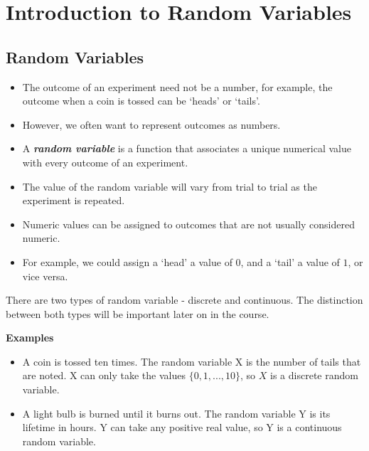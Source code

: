\documentclass[12pt]{report}
\begin{document}
{{\chapter{Introduction to Random Variables}
\section{Random Variables}
	\begin{itemize} \item The outcome of an experiment need not be a number, for example, the outcome when a coin is tossed can be `heads' or `tails'. \item
		However, we often want to represent outcomes as numbers. \item
		A \textbf{\emph{random variable}} is a function that associates a unique numerical value with every outcome of an experiment.
		\item The value of the random variable will vary from trial to trial as the experiment is repeated.
		\item Numeric values can be assigned to outcomes that are not usually considered numeric. \item For example, we could assign a `head' a value of $0$, and a `tail' a value of $1$, or vice versa.
	\end{itemize}

{ \Large
	There are two types of random variable - discrete and continuous. The distinction between both types will be important later on in the course.\\ \bigskip
	
	\textbf{Examples}
	\begin{itemize}
		\item A coin is tossed ten times. The random variable X is the number of tails that are noted.
		X can only take the values $\{0, 1, ..., 10\}$, so $X$ is a discrete random variable.
		\item A light bulb is burned until it burns out. The random variable Y is its lifetime in hours.
		Y can take any positive real value, so Y is a continuous random variable.
	\end{itemize}
}

}}
\end{document}
